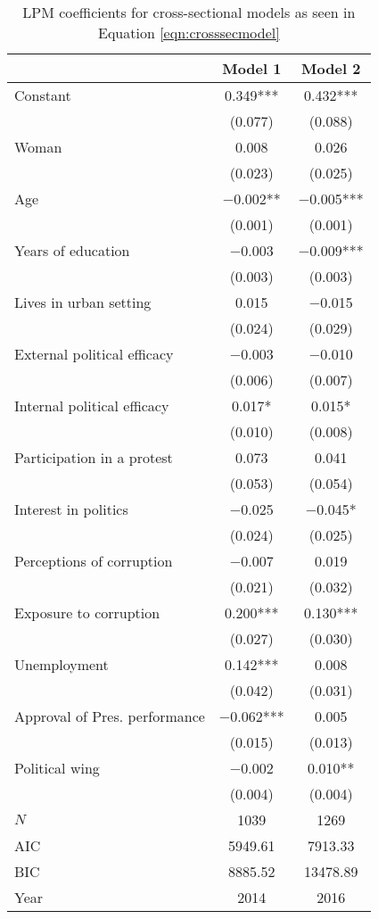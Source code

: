 \documentclass[12pt,a4]{article}
\begin{document}
\begin{table}[htbp]
\begin{center}
\caption{LPM coefficients for cross-sectional models as seen in Equation \ref{eqn:crosssecmodel}}
\label{tab:complexmodlpmcross}

\begin{tabular}[t]{lcc}
\toprule
  & Model 1 & Model 2\\
\midrule
Constant & \num{0.349}*** & \num{0.432}***\\
 & (\num{0.077}) & (\num{0.088})\\
Woman & \num{0.008} & \num{0.026}\\
 & (\num{0.023}) & (\num{0.025})\\
Age & \num{-0.002}** & \num{-0.005}***\\
 & (\num{0.001}) & (\num{0.001})\\
Years of education & \num{-0.003} & \num{-0.009}***\\
 & (\num{0.003}) & (\num{0.003})\\
Lives in urban setting & \num{0.015} & \num{-0.015}\\
 & (\num{0.024}) & (\num{0.029})\\
External political efficacy & \num{-0.003} & \num{-0.010}\\
 & (\num{0.006}) & (\num{0.007})\\
Internal political efficacy & \num{0.017}* & \num{0.015}*\\
 & (\num{0.010}) & (\num{0.008})\\
Participation in a protest & \num{0.073} & \num{0.041}\\
 & (\num{0.053}) & (\num{0.054})\\
Interest in politics & \num{-0.025} & \num{-0.045}*\\
 & (\num{0.024}) & (\num{0.025})\\
Perceptions of corruption & \num{-0.007} & \num{0.019}\\
 & (\num{0.021}) & (\num{0.032})\\
Exposure to corruption & \num{0.200}*** & \num{0.130}***\\
 & (\num{0.027}) & (\num{0.030})\\
Unemployment & \num{0.142}*** & \num{0.008}\\
 & (\num{0.042}) & (\num{0.031})\\
Approval of Pres. performance & \num{-0.062}*** & \num{0.005}\\
 & (\num{0.015}) & (\num{0.013})\\
Political wing & \num{-0.002} & \num{0.010}**\\
 & (\num{0.004}) & (\num{0.004})\\
\midrule
$N$ & \num{1039} & \num{1269}\\
AIC & \num{5949.61} & \num{7913.33}\\
BIC & \num{8885.52} & \num{13478.89}\\
Year & 2014 & 2016\\
\bottomrule
\end{tabular}



\end{center}
\end{table}
\end{document}
